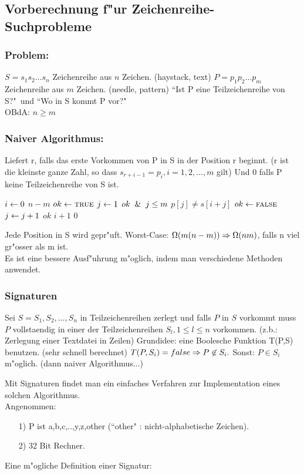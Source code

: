 \documentclass[a4paper]{scrartcl}
\begin{document}
\subsection{Vorberechnung f"ur Zeichenreihe-Suchprobleme}
\subsubsection*{Problem:}	
 $S=s_1 s_2 \dots s_n$ Zeichenreihe aus $n$ Zeichen. (haystack, text)
 $P=p_1 p_2 \dots p_m$ Zeichenreihe aus $m$ Zeichen. (needle, pattern)
 ``Ist P eine Teilzeichenreihe von S?"\ und ``Wo in S kommt P vor?"\\
 OBdA: $n \ge m$\\
 \subsubsection*{Naiver Algorithmus:}
 Liefert r, falls das erste Vorkommen von P in S in der Position r beginnt. (r ist die kleinste ganze Zahl, so dass $s_{r+i-1}=p_i, i=1,2,\dots,m$ gilt) Und 0 falls P keine Teilzeichenreihe von S ist.
 
 \begin{codebox}
 \li \For $i \leftarrow 0$ \To $n-m$ 
 \li \Do
 \li $ok \leftarrow \textnormal{\scshape true}$
 \li $j \leftarrow 1$
 \li \While $ok \And j \le m$ 
 \li 	\Do \If $p[j] \ne s[i+j]$ 
 \li 		$ok \leftarrow \textnormal{\scshape false}$
 \li	\Else $j\leftarrow j+1$
 		\End
 	\End
 \li \If $ok$ \Return $i+1$
 \End
 \li \Return $0$
 \end{codebox}
 Jede Position in S wird gepr"uft. Worst-Case: $\Omega(m(n-m))\Rightarrow\Omega(nm)$, falls n viel gr"osser als m ist.\\
 Es ist eine bessere Ausf"uhrung m"oglich, indem man verschiedene Methoden anwendet.
 \subsubsection*{Signaturen}
 Sei $S=S_1,S_2,\dots,S_n$ in  Teilzeichenreihen zerlegt und falls $P$ in $S$ vorkommt muss $P$ vollstaendig in einer der Teilzeichenreihen $S_l, 1 \le l \le n$ vorkommen. (z.b.: Zerlegung einer Textdatei in Zeilen)
 Grundidee: eine Boolesche Funktion T(P,S) benutzen. (sehr schnell berechnet)
 $T(P,S_i)=false \Rightarrow P \not\in S_i.$
 Sonst: $P \in S_i$ m"oglich. (dann naiver Algorithmus...)
 
 Mit Signaturen findet man ein einfaches Verfahren zur Implementation eines solchen Algorithmus.\\
 Angenommen:
 \begin{itemize}
 \item[1)] P ist {a,b,c,..,y,z,other} (``other" : nicht-alphabetische Zeichen).
 \item[2)] 32 Bit Rechner.
 \end{itemize}
 Eine m"ogliche Definition einer Signatur:
\end{document}
